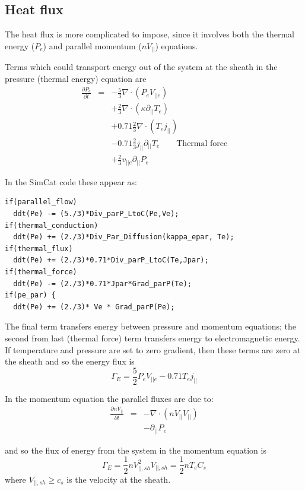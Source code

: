 \documentclass[12pt,a4paper]{article}
\begin{document}
\subsection{Heat flux}

The heat flux is more complicated to impose, since it involves both the thermal energy ($P_e$) and parallel momentum ($nV_{||}$) equations.

Terms which could transport energy out of the system at the sheath in the pressure (thermal energy) equation are
\begin{eqnarray}
  \frac{\partial P_e}{\partial t} &=& -\frac{5}{3}\nabla\cdot\left(P_eV_{||e}\right) \\
  && + \frac{2}{3}\nabla\cdot\left(\kappa\partial_{||}T_e\right) \\
  && + 0.71 \frac{2}{3} \nabla\cdot\left(T_ej_{||}\right) \\
  && - 0.71 \frac{2}{3} j_{||} \partial_{||}T_e \qquad \textrm{Thermal force} \\
  && + \frac{2}{3} v_{||e}\partial_{||} P_e
\end{eqnarray}

In the SimCat code these appear as:
\begin{verbatim}
if(parallel_flow)
  ddt(Pe) -= (5./3)*Div_parP_LtoC(Pe,Ve);
if(thermal_conduction)
  ddt(Pe) += (2./3)*Div_Par_Diffusion(kappa_epar, Te);
if(thermal_flux)
  ddt(Pe) += (2./3)*0.71*Div_parP_LtoC(Te,Jpar);
if(thermal_force)
  ddt(Pe) -= (2./3)*0.71*Jpar*Grad_parP(Te);
if(pe_par) {
  ddt(Pe) += (2./3)* Ve * Grad_parP(Pe);
\end{verbatim}

The final term transfers energy between pressure and momentum equations; the second from last (thermal force) term transfers energy to electromagnetic energy. 
If temperature and pressure are set to zero gradient, then these terms are zero at the sheath and so the energy flux is
\begin{equation}
  \Gamma_E = \frac{5}{2}P_eV_{||e} - 0.71T_ej_{||}
\end{equation}

In the momentum equation the parallel fluxes are due to:
\begin{eqnarray}
  \frac{\partial nV_{||}}{\partial t} &=& -\nabla\cdot\left(nV_{||} V_{||}\right) \\
  && - \partial_{||}P_e
\end{eqnarray}

and so the flux of energy from the system in the momentum equation is
\begin{equation}
  \Gamma_E = \frac{1}{2} nV_{||,sh}^2V_{||,sh} = \frac{1}{2}nT_eC_s
\end{equation}
where $V_{||,sh} \ge c_s$ is the velocity at the sheath.
\end{document}
